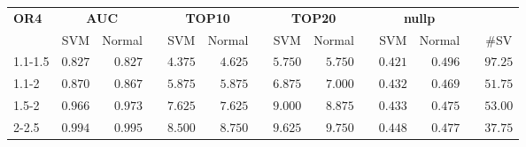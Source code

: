 %
\begin{table}[!tbp]
\begin{center}
\begin{tabular}{lrrcrrcrrcrrcr}
\hline\hline
\multicolumn{1}{l}{\bfseries OR4}&\multicolumn{2}{c}{\bfseries AUC}&\multicolumn{1}{c}{\bfseries }&\multicolumn{2}{c}{\bfseries TOP10}&\multicolumn{1}{c}{\bfseries }&\multicolumn{2}{c}{\bfseries TOP20}&\multicolumn{1}{c}{\bfseries }&\multicolumn{2}{c}{\bfseries nullp}&\multicolumn{1}{c}{\bfseries }&\multicolumn{1}{c}{\bfseries }\tabularnewline
\cline{2-3} \cline{5-6} \cline{8-9} \cline{11-12}
\multicolumn{1}{l}{}&\multicolumn{1}{c}{SVM}&\multicolumn{1}{c}{Normal}&\multicolumn{1}{c}{}&\multicolumn{1}{c}{SVM}&\multicolumn{1}{c}{Normal}&\multicolumn{1}{c}{}&\multicolumn{1}{c}{SVM}&\multicolumn{1}{c}{Normal}&\multicolumn{1}{c}{}&\multicolumn{1}{c}{SVM}&\multicolumn{1}{c}{Normal}&\multicolumn{1}{c}{}&\multicolumn{1}{c}{\#SV}\tabularnewline
\hline
1.1-1.5&$0.827$&$0.827$&&$4.375$&$4.625$&&$5.750$&$5.750$&&$0.421$&$0.496$&&$97.25$\tabularnewline
1.1-2&$0.870$&$0.867$&&$5.875$&$5.875$&&$6.875$&$7.000$&&$0.432$&$0.469$&&$51.75$\tabularnewline
1.5-2&$0.966$&$0.973$&&$7.625$&$7.625$&&$9.000$&$8.875$&&$0.433$&$0.475$&&$53.00$\tabularnewline
2-2.5&$0.994$&$0.995$&&$8.500$&$8.750$&&$9.625$&$9.750$&&$0.448$&$0.477$&&$37.75$\tabularnewline
\hline
\end{tabular}
\end{center}
\end{table}

